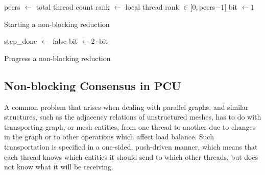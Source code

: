 \begin{algorithm}
  peers $\gets$ total thread count\;
  rank $\gets$ local thread rank $\in[0,$peers$-1]$\;
  bit $\gets 1$\;
  \caption{Starting a non-blocking reduction}
  \label{alg:start_reduce}
\end{algorithm}

\begin{algorithm}
  step\_done $\gets$ false\;
  bit $\gets 2\cdot$bit\;
  \caption{Progress a non-blocking reduction}
  \label{alg:progress_reduce}
\end{algorithm}

\subsection{Non-blocking Consensus in PCU}
\label{sec:pcu_phased}

A common problem that arises when dealing with parallel graphs,
and similar structures, such as the adjacency relations of unstructured
meshes, has to do with transporting graph, or mesh entities, from
one thread to another
due to changes in the graph or to other operations which affect
load balance.
Such transportation is specified in a one-sided,
push-driven manner, which means that each thread knows which
entities it should send to which other threads, but does
not know what it will be receiving.

